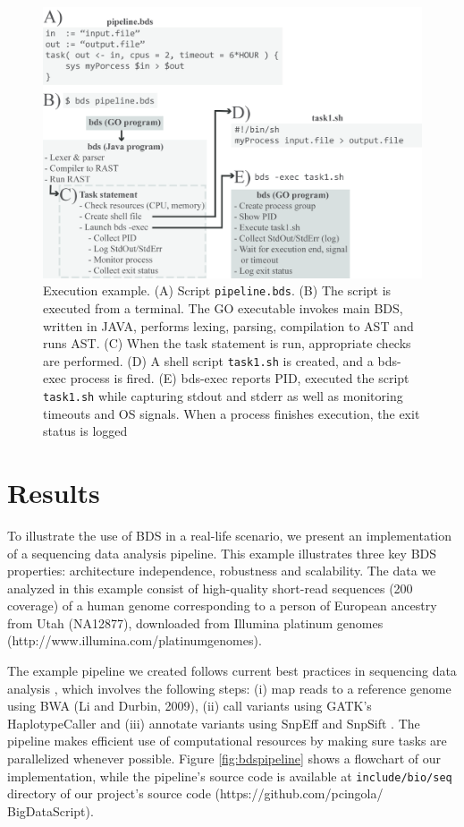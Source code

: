 \begin{figure}
    \centering
    \includegraphics[width=12cm]{bds_figure_1_small.png}
    \caption{Execution example. (A) Script \texttt{pipeline.bds}. (B) The script is executed from a terminal. The GO executable invokes main BDS, written in JAVA, performs lexing, parsing, compilation to AST and runs AST. (C) When the task statement is run, appropriate checks are performed. (D) A shell script \texttt{task1.sh} is created, and a bds-exec process is fired. (E) bds-exec reports PID, executed the script \texttt{task1.sh} while capturing stdout and stderr as well as monitoring timeouts and OS signals. When a process finishes execution, the exit status is logged}
    \label{fig:bdsexec}
\end{figure}

\section{Results}

To illustrate the use of BDS in a real-life scenario, we present an implementation of a sequencing data analysis pipeline. This example illustrates three key BDS properties: architecture independence, robustness and scalability. The data we analyzed in this example consist of high-quality short-read sequences (200 coverage) of a human genome corresponding to a person of European ancestry from Utah (NA12877), downloaded from Illumina platinum genomes (http://www.illumina.com/platinumgenomes).

The example pipeline we created follows current best practices in sequencing data analysis \cite{McKenna2010}, which involves the following steps: (i) map reads to a reference genome using BWA (Li and Durbin, 2009), (ii) call variants using GATK’s HaplotypeCaller and (iii) annotate variants using SnpEff \cite{Cingolani2012b} and SnpSift \cite{Cingolani2012a}. The pipeline makes efficient use of computational resources by making sure tasks are parallelized whenever possible. Figure \ref{fig:bdspipeline} shows a flowchart of our implementation, while the pipeline’s source code is available at \texttt{include/bio/seq} directory of our project’s source code (https://github.com/pcingola/ BigDataScript).

